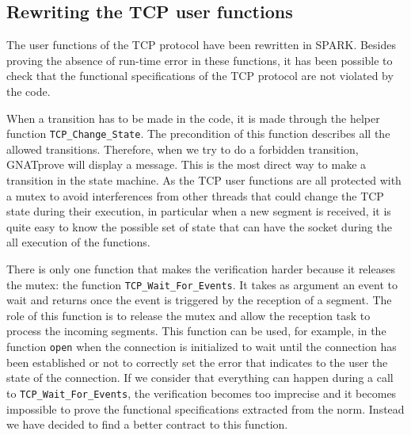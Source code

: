 \documentclass[conference]{IEEEtran}
\def\spark#1{\lstinline[language=Ada]{#1}}
\begin{document}
\subsection{Rewriting the TCP user functions}

The user functions of the TCP protocol have been rewritten in SPARK. Besides
proving the absence of run-time error in these functions, it has been possible
to check that the functional specifications of the TCP protocol are not violated
by the code.



When a transition has to be made in the code, it is made through the helper
function \spark{TCP_Change_State}. The precondition of this function describes
all the allowed transitions. Therefore, when we try to do a forbidden transition,
GNATprove will display a message. This is the most direct way to make a
transition in the state machine.
As the TCP user functions are all protected with a mutex to avoid interferences
from other threads that could change the TCP state during their execution, in
particular when a new segment is received, it is quite easy to know the
possible set of state that can have the socket during the all execution of the
functions.

There is only one function that makes the verification harder because it
releases the mutex: the function \spark{TCP_Wait_For_Events}.
It takes as argument an event to wait and returns once the event
is triggered by the reception of a segment.
The role of this
function is to release the mutex and allow the reception task to process the
incoming segments. This function
can be used, for example, in the function \spark{open} when the connection
is initialized to wait until the connection has been established or not to
correctly set the error that indicates to the user the state of the connection.
If we consider that everything can happen during a call to \spark{TCP_Wait_For_Events},
the verification becomes too imprecise and it becomes impossible to prove the
functional specifications extracted from the norm. Instead we have decided to
find a better contract to this function.
\end{document}
